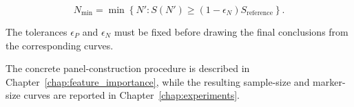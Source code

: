 \begin{equation}
    N_{\min}
    =
    \min
    \left\{
        N'
        :
        S(N')
        \geq
        (1-\epsilon_N)
        S_{\mathrm{reference}}
    \right\}.
    \label{eq:minimum_sample_definition}
\end{equation}

The tolerances $\epsilon_P$ and $\epsilon_N$ must be fixed before
drawing the final conclusions from the corresponding curves.


The concrete panel-construction procedure is described in
Chapter~\ref{chap:feature_importance}, while the resulting
sample-size and marker-size curves are reported in
Chapter~\ref{chap:experiments}.
